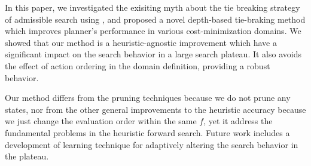 In this paper, we investigated the exisiting myth about the tie breaking
strategy of admissible search using \astar, and proposed a novel
depth-based tie-braking method which improves planner's performance in various
cost-minimization domains.
We showed that
our method is a heuristic-agnostic improvement which have a significant
impact on the search behavior in a large search plateau.
It also avoids the effect of action ordering in the domain definition,
providing a robust behavior.


Our method differs from the pruning techniques because we do not prune
any states, nor from the other general improvements to the heuristic
accuracy because we just change the evaluation order within the same
$f$, yet it address the fundamental problems in the heuristic forward
search. 
% 
Future work includes a development of learning technique for
adaptively altering the search behavior in the plateau.



